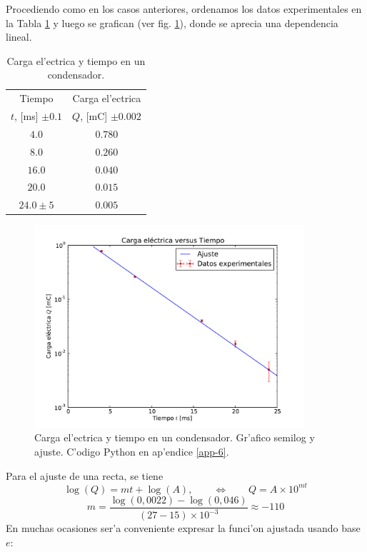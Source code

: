 Procediendo como en los casos anteriores, ordenamos los datos experimentales en la Tabla \ref{tab-exp3} y luego se grafican (ver fig. \ref{fig-exp3}),  donde se aprecia una dependencia lineal.
\begin{table}[h!]
\begin{center}
\begin{tabular}{|c|c|}
\hline 
Tiempo & Carga el'ectrica \\ 
$t$, [ms] $\pm 0.1$ & $Q$, [mC] $\pm 0.002$ \\ \hline
$4.0$ & $0.780$ \\ \hline 
$8.0$ & $0.260$ \\ \hline
$16.0$ & $0.040$ \\ \hline
$20.0$ & $0.015$ \\ \hline
$24.0\pm 5$ & $0.005$\\ \hline
\end{tabular}
\caption{Carga el'ectrica y tiempo en un condensador.}
\label{tab-exp3}
\end{center}
\end{table}
\begin{figure}[h!]
\begin{center}
\includegraphics[width=10cm]{figs/fig-ajuste-semilog.pdf}
\caption{Carga el'ectrica y tiempo en un condensador. Gr'afico semilog y ajuste. C'odigo Python en ap'endice \ref{app-6}.}
\end{center}
\label{fig-exp3}
\end{figure}

Para el ajuste de una recta, se tiene
\begin{equation}\label{logQt}
\log(Q)=mt+\log(A), \qquad \Leftrightarrow \qquad Q=A\times 10^{mt}
\end{equation}
\begin{equation}
m=\frac{\log(0,0022)-\log(0,046)}{(27-15)\times 10^{-3}}\approx -110
\end{equation}
En muchas ocasiones ser'a conveniente expresar la funci'on ajustada usando base $e$:

